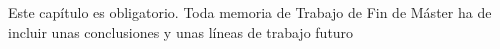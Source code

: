 

Este capítulo es obligatorio.
Toda memoria de Trabajo de Fin de Máster ha de incluir unas conclusiones y unas 
líneas de trabajo futuro 

